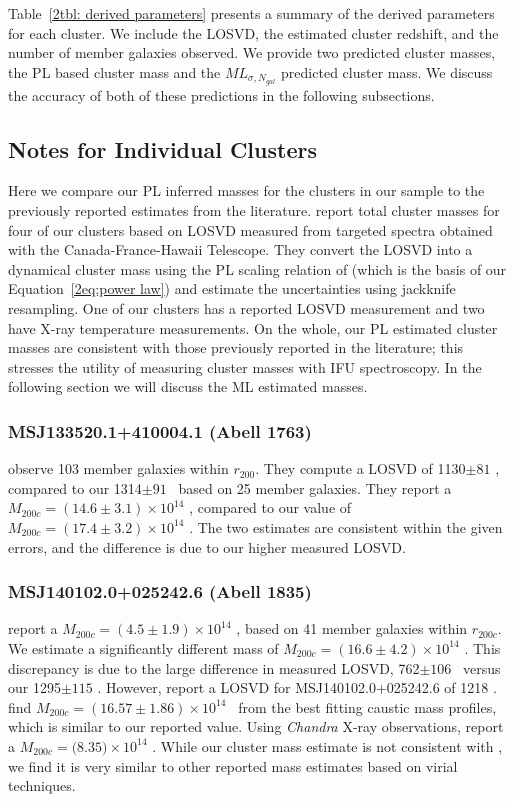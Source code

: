 Table~\ref{2tbl: derived parameters} presents a summary of the derived parameters for each cluster. We include the LOSVD, the estimated cluster redshift, and the number of member galaxies observed. We provide two predicted cluster masses, the PL based cluster mass and the $ML_{\sigma, N_{gal}}$ predicted cluster mass. We discuss the accuracy of both of these predictions in the following subsections.

\subsection{Notes for Individual Clusters}
Here we compare our PL inferred masses for the clusters in our sample to the previously reported estimates from the literature. \cite{Sifon2015} report total cluster masses for four of our clusters based on LOSVD measured from targeted spectra obtained with the Canada-France-Hawaii Telescope. They convert the LOSVD into a dynamical cluster mass using the PL scaling relation of \cite{Evrard2008} (which is the basis of our Equation~\ref{2eq:power law}) and estimate the uncertainties using jackknife resampling. One of our clusters has a reported LOSVD measurement and two have X-ray temperature measurements. On the whole, our PL estimated cluster masses are consistent with those previously reported in the literature; this stresses the utility of measuring cluster masses with IFU spectroscopy. In the following section we will discuss the ML estimated masses.

\subsubsection{MSJ133520.1+410004.1 (Abell 1763)}
\cite{Sifon2015} observe 103 member galaxies within $r_{200}$. They compute a LOSVD of 1130$\pm81$ \kms, compared to our 1314$\pm91$ \kms\ based on 25 member galaxies. They report a $M_{200c} = (14.6\pm3.1) \times 10^{14}$ \Msol, compared to our value of $M_{200c} = (17.4\pm3.2) \times 10^{14}$ \Msol. The two estimates are consistent within the given errors, and the difference is due to our higher measured LOSVD.

\subsubsection{MSJ140102.0+025242.6 (Abell 1835)}
\cite{Sifon2015} report a $M_{200c} = (4.5\pm1.9) \times 10^{14}$ \Msol, based on 41 member galaxies within
$r_{200c}$. We estimate a significantly different mass of $M_{200c} = (16.6\pm4.2)\times 10^{14}$ \Msol.
This discrepancy is due to the large difference in measured LOSVD, 762$\pm106$ \kms\ versus our
1295$\pm115$ \kms. However, \cite{Hoekstra2012} report a LOSVD for MSJ140102.0+025242.6 of 1218 \kms.
\cite{Geller2013} find $M_{200c} = (16.57\pm1.86)\times 10^{14}$ \Msol\ from the best fitting caustic mass
profiles, which is similar to our reported value. Using \emph{Chandra} X-ray observations,
\cite{Bonamente2012} report a $M_{200c} = (8.35$$)\times 10^{14}$ \Msol. While our cluster
mass estimate is not consistent with \cite{Sifon2015}, we find it is very similar to other reported mass
estimates based on virial techniques.

